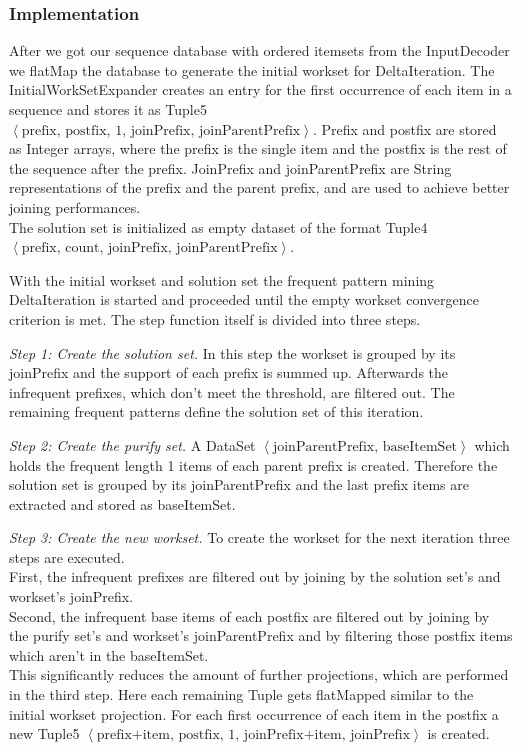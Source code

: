 \documentclass[a4paper,10pt,twocolumn]{article}
\begin{document}
\subsubsection*{Implementation}
After we got our sequence database with ordered itemsets from the InputDecoder we flatMap the database to generate the initial workset for DeltaIteration. The InitialWorkSetExpander creates an entry for the first occurrence of each item in a sequence and stores it as Tuple5 $\left\langle \text{prefix, postfix, 1, joinPrefix, joinParentPrefix}\right\rangle$. Prefix and postfix are stored as Integer arrays, where the prefix is the single item and the postfix is the rest of the sequence after the prefix. JoinPrefix and joinParentPrefix are String representations of the prefix and the parent prefix, and are used to achieve better joining performances.\\
The solution set is initialized as empty dataset of the format Tuple4 $\left\langle \text{prefix, count, joinPrefix, joinParentPrefix}\right\rangle$.

With the initial workset and solution set the frequent pattern mining DeltaIteration is started and proceeded until the empty workset convergence criterion is met. The step function itself is divided into three steps.

\textit{Step 1: Create the solution set.} In this step the workset is grouped by its joinPrefix and the support of each prefix is summed up. Afterwards the infrequent prefixes, which don't meet the threshold, are filtered out. The remaining frequent patterns define the solution set of this iteration.

\textit{Step 2: Create the purify set.} A DataSet $\left\langle \text{joinParentPrefix, baseItemSet}\right\rangle$ which holds the frequent length 1 items of each parent prefix is created. Therefore the solution set is grouped by its joinParentPrefix and the last prefix items are extracted and stored as baseItemSet.

\textit{Step 3: Create the new workset.} To create the workset for the next iteration three steps are executed.\\
First, the infrequent prefixes are filtered out by joining by the solution set's and workset's joinPrefix.\\
Second, the infrequent base items of each postfix are filtered out by joining by the purify set's and workset's joinParentPrefix and by filtering those postfix items which aren't in the baseItemSet.\\
This significantly reduces the amount of further projections, which are performed in the third step. Here each remaining Tuple gets flatMapped similar to the initial workset projection. For each first occurrence of each item in the postfix a new Tuple5 $\left\langle \text{prefix+item, postfix, 1, joinPrefix+item, joinPrefix}\right\rangle$ is created.
\end{document}

